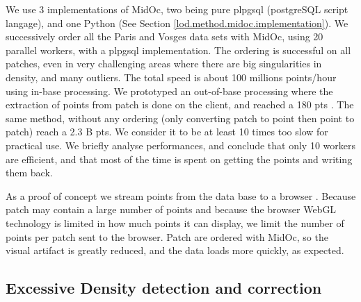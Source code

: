 		
		We use 3 implementations of MidOc, two being pure plpgsql (postgreSQL script langage), and one Python (See Section \ref{lod.method.midoc.implementation}).
		We successively order all the Paris and Vosges data sets with MidOc, using 20 parallel workers, with a plpgsql implementation.
		The ordering is successful on all patches, even in very challenging areas where there are big singularities in density, and many outliers.
		The total speed is about 100 millions points/hour using in-base processing.
		We prototyped an out-of-base processing where the extraction of points from patch is done on the client, and reached a 180 \mega pts \per \hour.
		The same method, without any ordering (only converting patch to point then point to patch) reach a 2.3 B pts\per\hour.
		We consider it to be at least 10 times too slow for practical use.
		We briefly analyse performances, and conclude that only 10 workers are efficient, and that most of the time is spent on getting the points and writing them back.
		
		 
		As a proof of concept we stream points from the data base to a browser \cite{IGN2014a}. Because patch may contain a large number of points and because the browser WebGL technology is limited in how much points it can display,
		we limit the number of points per patch sent to the browser. Patch are ordered with MidOc, so the visual artifact is greatly reduced, and the data loads more quickly, as expected. 


	\subsection{Excessive Density detection and correction} 
		
